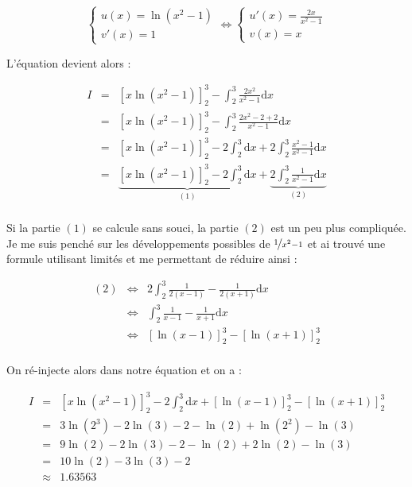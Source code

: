 \documentclass[a4paper, 11pt]{report} %
\newcommand{\dx}{\mathrm{d}x}
\begin{document}
\[
\left\{
\begin{array}{l}
u(x) = \ln(x^2-1)\\
v'(x) = 1
\end{array}
\right.
\Leftrightarrow
\left\{
\begin{array}{l}
u'(x) = \frac{2x}{x^2-1}\\ 
v(x) = x
\end{array}
\right.
\]

L'équation devient alors :

\begin{eqnarray*}
I & = & \left[x\ln(x^2-1)\right]_2^3 - \int_2^3\frac{2x^2}{x^2-1}\dx\\
& = & \left[x\ln(x^2-1)\right]_2^3 - \int_2^3\frac{2x^2 - 2 + 2}{x^2-1}\dx\\
& = & \left[x\ln(x^2-1)\right]_2^3 - 2\int_2^3\dx+2\int_2^3\frac{x^2 - 1}{x^2-1}\dx\\
& = & \underbrace{\left[x\ln(x^2-1)\right]_2^3 - 2\int_2^3\dx}_{(1)} + \underbrace{2\int_2^3\frac{1}{x^2-1}\dx}_{(2)}\\
\end{eqnarray*}

Si la partie $(1)$ se calcule sans souci, la partie $(2)$ est un peu plus compliquée.
Je me suis penché sur les développements possibles de $\nicefrac{1}{x^2-1}$ et ai trouvé une formule utilisant limités
et me permettant de réduire ainsi :

\begin{eqnarray*}
(2) & \Leftrightarrow & 2\int_2^3\frac{1}{2(x-1)}-\frac{1}{2(x+1)}\dx\\
& \Leftrightarrow & \int_2^3\frac{1}{x-1}-\frac{1}{x+1}\dx\\
& \Leftrightarrow & \left[\ln(x-1)\right]_2^3-\left[\ln(x+1)\right]_2^3\\
\end{eqnarray*}

On ré-injecte alors dans notre équation et on a :

\begin{eqnarray*}
I & = & \left[x\ln(x^2-1)\right]_2^3 - 2\int_2^3\dx + \left[\ln(x-1)\right]_2^3-\left[\ln(x+1)\right]_2^3\\
& = & 3\ln(2^3)-2\ln(3)-2-\ln(2)+\ln(2^2)-\ln(3)\\
& = & 9\ln(2) - 2\ln(3)-2-\ln(2)+2\ln(2)-\ln(3)\\
& = & 10\ln(2) - 3\ln(3) -2\\
& \approx & 1.63563
\end{eqnarray*}
\end{document}

